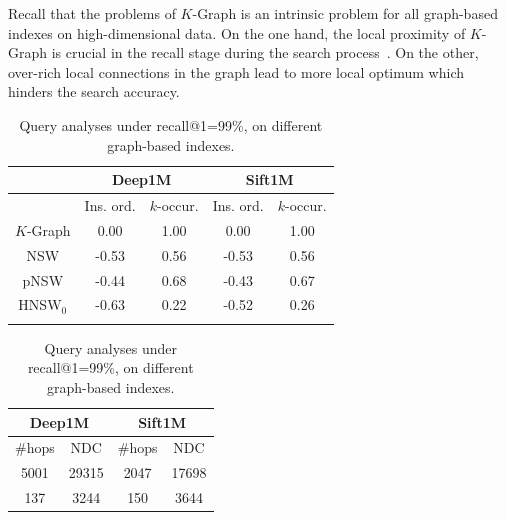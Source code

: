 \documentclass[11pt]{article}
\begin{document}
Recall that the problems of $K$-Graph is an intrinsic problem for all graph-based indexes on high-dimensional data.
On the one hand, the local proximity of $K$-Graph is crucial in the recall stage during the search process~\cite{note}.
On the other, over-rich local connections in the graph lead to more local optimum which hinders the search accuracy.
\begin{table}[tb]
\begin{minipage}{.4\linewidth}
    \footnotesize
        \caption{Pearson correlation coefficients between in-degree and insertion-order/$k$-occurrence of points on different indexes.}
    \begin{tabular}{ccccc}\\
\toprule
& \multicolumn{2}{c}{Deep1M} & \multicolumn{2}{c}{Sift1M} \\\midrule
& Ins. ord.     & $k$-occur.    & Ins. ord.     & $k$-occur.    \\\midrule
$K$-Graph & 0.00  & 1.00 & 0.00 & 1.00  \\ \midrule
NSW       & -0.53  & 0.56 & -0.53 & 0.56  \\ \midrule
pNSW      & -0.44  & 0.68 & -0.43 & 0.67 \\ \midrule
HNSW$_0$   & -0.63  & 0.22 & -0.52 & 0.26  \\ \bottomrule \\
\end{tabular}
    \label{zeyu_tab:corr}
\end{minipage}%
\hspace{6mm}
\begin{minipage}{.31\linewidth}
    \centering
    \footnotesize
     \caption{Query analyses under recall@1=99\%, on different graph-based indexes.}
\begin{tabular}{cccc}\\
\toprule
 \multicolumn{2}{c}{Deep1M} & \multicolumn{2}{c}{Sift1M} \\\midrule
 \#hops     & NDC    & \#hops     & NDC  \\\midrule
  5001  & 29315 & 2047 & 17698  \\ \midrule
        137  & 3244 & 150 & 3644  \\ \midrule

\end{tabular}
\end{minipage}
\end{table}
\end{document}
